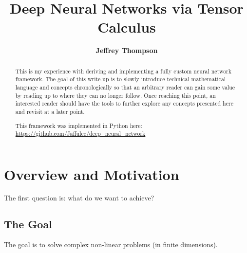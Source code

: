 \documentclass[a4paper]{article}
\theoremstyle{plain} %
\theoremstyle{definition} %
\numberwithin{equation}{subsection}
\begin{document}

\title{\textbf{Deep Neural Networks via Tensor Calculus}}




\author{\textbf{Jeffrey Thompson}}
\maketitle
\begin{abstract}
This is my experience with deriving and implementing a fully custom neural network framework. 
The goal of this write-up is to slowly introduce technical mathematical language and concepts chronologically 
so that an arbitrary reader can gain some value by reading up to where they can no longer follow. Once reaching this point, 
an interested reader should have the tools to further explore any concepts presented here and revisit at a later point.

This framework was implemented in Python here: \url{https://github.com/Jaffulee/deep_neural_network}
\end{abstract}
\tableofcontents
\newpage
\section{Overview and Motivation}
The first question is: what do we want to achieve?

\subsection{The Goal}
The goal is to solve complex non-linear problems (in finite dimensions).
\end{document}
